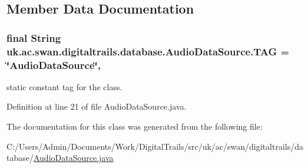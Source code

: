 \subsection{Member Data Documentation}
\hypertarget{classuk_1_1ac_1_1swan_1_1digitaltrails_1_1database_1_1_audio_data_source_aba39b0e1f15dae42786a0094543efc05}{
\subsubsection[{T\+A\+G}]{\setlength{\rightskip}{0pt plus 5cm}final String uk.\+ac.\+swan.\+digitaltrails.\+database.\+Audio\+Data\+Source.\+T\+A\+G = \char`\"{}Audio\+Data\+Source\char`\"{}\hspace{0.3cm}{\ttfamily [static]}, {\ttfamily [private]}}}\label{classuk_1_1ac_1_1swan_1_1digitaltrails_1_1database_1_1_audio_data_source_aba39b0e1f15dae42786a0094543efc05}


static constant tag for the class. 



Definition at line 21 of file Audio\+Data\+Source.\+java.



The documentation for this class was generated from the following file\+:\begin{DoxyCompactItemize}
\item 
C\+:/\+Users/\+Admin/\+Documents/\+Work/\+Digital\+Trails/src/uk/ac/swan/digitaltrails/database/\hyperlink{_audio_data_source_8java}{Audio\+Data\+Source.\+java}\end{DoxyCompactItemize}
